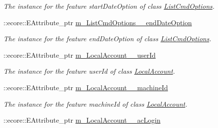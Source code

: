 \begin{DoxyCompactItemize}
\begin{DoxyCompactList}\small\item\em The instance for the feature startDateOption of class \hyperlink{classUMS__Data_1_1ListCmdOptions}{ListCmdOptions}. \item\end{DoxyCompactList}\item 
\hypertarget{classUMS__Data_1_1UMS__DataPackage_a27cd5e0069fad20663c4145de57bd340}{
::ecore::EAttribute\_\-ptr \hyperlink{classUMS__Data_1_1UMS__DataPackage_a27cd5e0069fad20663c4145de57bd340}{m\_\-ListCmdOptions\_\-\_\-endDateOption}}
\label{classUMS__Data_1_1UMS__DataPackage_a27cd5e0069fad20663c4145de57bd340}

\begin{DoxyCompactList}\small\item\em The instance for the feature endDateOption of class \hyperlink{classUMS__Data_1_1ListCmdOptions}{ListCmdOptions}. \item\end{DoxyCompactList}\item 
\hypertarget{classUMS__Data_1_1UMS__DataPackage_ae072c6ff1652457b20e6035414a4212c}{
::ecore::EAttribute\_\-ptr \hyperlink{classUMS__Data_1_1UMS__DataPackage_ae072c6ff1652457b20e6035414a4212c}{m\_\-LocalAccount\_\-\_\-userId}}
\label{classUMS__Data_1_1UMS__DataPackage_ae072c6ff1652457b20e6035414a4212c}

\begin{DoxyCompactList}\small\item\em The instance for the feature userId of class \hyperlink{classUMS__Data_1_1LocalAccount}{LocalAccount}. \item\end{DoxyCompactList}\item 
\hypertarget{classUMS__Data_1_1UMS__DataPackage_ae5837389bce3b80baef80c1e4e5f48e4}{
::ecore::EAttribute\_\-ptr \hyperlink{classUMS__Data_1_1UMS__DataPackage_ae5837389bce3b80baef80c1e4e5f48e4}{m\_\-LocalAccount\_\-\_\-machineId}}
\label{classUMS__Data_1_1UMS__DataPackage_ae5837389bce3b80baef80c1e4e5f48e4}

\begin{DoxyCompactList}\small\item\em The instance for the feature machineId of class \hyperlink{classUMS__Data_1_1LocalAccount}{LocalAccount}. \item\end{DoxyCompactList}\item 
\hypertarget{classUMS__Data_1_1UMS__DataPackage_a71304b56224bef17e5cca14ec4371a19}{
::ecore::EAttribute\_\-ptr \hyperlink{classUMS__Data_1_1UMS__DataPackage_a71304b56224bef17e5cca14ec4371a19}{m\_\-LocalAccount\_\-\_\-acLogin}}
\label{classUMS__Data_1_1UMS__DataPackage_a71304b56224bef17e5cca14ec4371a19}


\end{DoxyCompactItemize}
